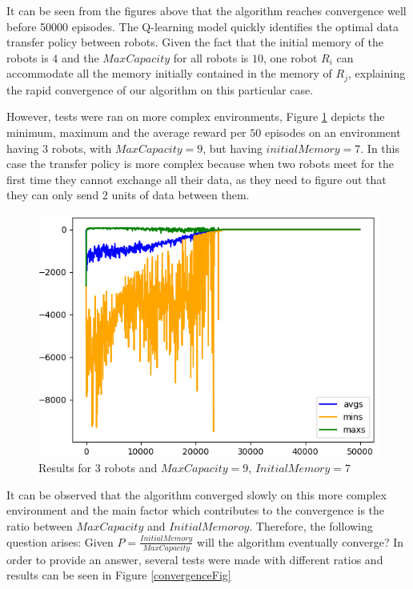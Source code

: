 \par It can be seen from the figures above that the algorithm reaches convergence well before 50000 episodes. The Q-learning model quickly identifies the optimal data transfer policy between robots. Given the fact that the initial memory of the robots is $4$ and the $MaxCapacity$ for all robots is $10$, one robot $R_i$ can accommodate all the memory initially contained in the memory of $R_j$, explaining the rapid convergence of our algorithm on this particular case.
\par However, tests were ran on more complex environments, Figure \ref{allRewards} depicts the minimum, maximum and the average reward per $50$ episodes on an environment having 3 robots, with $MaxCapacity = 9$, but having $initialMemory = 7$. In this case the transfer policy is more complex because when two robots meet for the first time they cannot exchange all their data, as they need to figure out that they can only send $2$ units of data between them.

\begin{figure}[!htb]
\centering
\includegraphics[scale=0.7]{Figures/plotBigEnv.png}
\caption{Results for 3 robots and $MaxCapacity=9$, $InitialMemory=7$}
\label{allRewards}
\end{figure}

\par It can be observed that the algorithm converged slowly on this more complex environment and the main factor which contributes to the convergence is the ratio between $MaxCapacity$ and $InitialMemoroy$. Therefore, the following question arises: Given $P=\frac{InitialMemory}{MaxCapacity}$ will the algorithm eventually converge? In order to provide an answer, several tests were made with different ratios and results can be seen in Figure \ref{convergenceFig}

